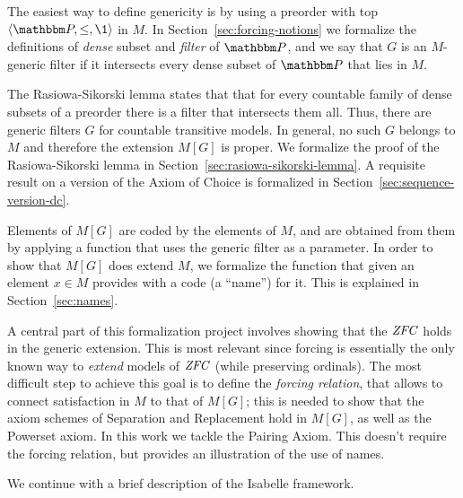 The easiest way to define genericity is by using a preorder with top
$\lb\PP,\leq,\1\rb$ in $M$.   
In Section~\ref{sec:forcing-notions} we formalize the definitions of
\emph{dense} subset and  \emph{filter} of  $\PP$, and we say that  $G$
is an $M$-generic filter
if it intersects every dense subset of $\PP$ that lies in $M$.

The  Rasiowa-Sikorski lemma  states that that for every countable 
family of dense subsets of a preorder there is a filter that intersects them
all. Thus, there are generic filters $G$ for countable transitive models.  In
general, no such  $G$ belongs to $M$ and therefore the extension
$M[G]$ is proper. We formalize the proof of the Rasiowa-Sikorski lemma
in Section~\ref{sec:rasiowa-sikorski-lemma}. A requisite result on
a version of the Axiom of Choice is formalized in
Section~\ref{sec:sequence-version-dc}.

Elements of $M[G]$ are coded by the elements of $M$, and are obtained
from them by applying a function  that uses the generic filter
as a parameter. In order to show
that $M[G]$ does  extend $M$, we formalize the function 
that given an element $x\in M$ provides with a code (a ``name'') for
it.  This is explained in Section~\ref{sec:names}.

A central part of this formalization project involves showing that the
$\mathit{ZFC}$ holds in the generic extension. This is most relevant since
forcing is essentially the only known way to \emph{extend} models of
$\mathit{ZFC}$ (while preserving ordinals). The most difficult step to achieve
this goal is to define the \emph{forcing relation}, that allows to
connect satisfaction in $M$ to that of $M[G]$; this is needed to show
that the axiom schemes of Separation and Replacement hold in $M[G]$,
as well as the Powerset axiom. In this work we tackle the Pairing
Axiom. This doesn't require the 
forcing relation, but provides an illustration of the use of names.  
   
We continue with a brief description of the Isabelle framework. 
